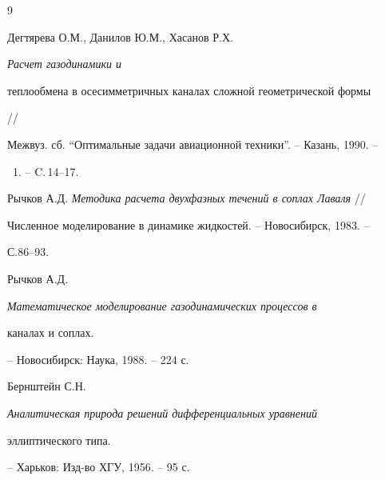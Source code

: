 \begin{thebibliography}{9} 


 




Дегтярева О.М., Данилов Ю.М., Хасанов Р.Х. {\em Расчет газодинамики и 


теплообмена в осесимметричных каналах сложной геометрической формы} // 


Межвуз. сб. ``Оптимальные задачи авиационной техники''. -- Казань, 1990. -- 


\No\, 1. -- C.\,14--17.


 




Рычков А.Д. {\em Методика расчета двухфазных течений в соплах Лаваля} // 


Численное моделирование в динамике жидкостей. -- Новосибирск, 1983. -- 


С.86--93. 


 




Рычков А.Д. {\em Математическое моделирование газодинамических процессов в 


каналах и соплах.} -- Новосибирск: Наука, 1988. -- 224 с. 


 




Бернштейн С.Н. {\em Аналитическая природа решений дифференциальных уравнений 


эллиптического типа.} -- Харьков: Изд-во ХГУ, 1956. -- 95 с. 


 


\end{thebibliography} 


 


\vskip 2cm 


 






 


 


